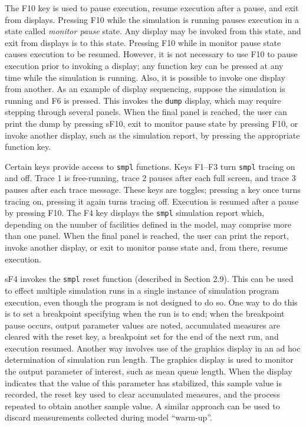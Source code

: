 The F10 key is used to pause execution, resume execution after a pause,
and exit from displays. Pressing F10 while the simulation is running pauses
execution in a state called \emph{monitor pause} state. Any display may be invoked
from this state, and exit from displays is to this state. Pressing F10 while in
monitor pause state causes execution to be resumed. However, it is not
necessary to use F10 to pause execution prior to invoking a display; any
function key can be pressed at any time while the simulation is running.
Also, it is possible to invoke one display from another. As an example of
display sequencing, suppose the simulation is running and F6 is pressed. This
invokes the \texttt{dump} display, which may require stepping through several
panels. When the final panel is reached, the user can print the dump by
pressing sF10, exit to monitor pause state by pressing F10, or invoke another
display, such as the simulation report, by pressing the appropriate function
key.

Certain keys provide access to \texttt{smpl} functions. Keys F1--F3 turn \texttt{smpl}
tracing on and off. Trace 1 is free-running, trace 2 pauses after each full
screen, and trace 3 pauses after each trace message. These keys are toggles;
pressing a key once turns tracing on, pressing it again turns tracing off.
Execution is resumed after a pause by pressing F10. The F4 key displays the
\texttt{smpl} simulation report which, depending on the number of facilities defined
in the model, may comprise more than one panel. When the final panel is
reached, the user can print the report, invoke another display, or exit to
monitor pause state and, from there, resume execution.

sF4 invokes the \texttt{smpl} reset function (described in Section 2.9). This can be
used to effect multiple simulation runs in a single instance of simulation
program execution, even though the program is not designed to do so. One
way to do this is to set a breakpoint specifying when the run is to end; when
the breakpoint pause occurs, output parameter values are noted, accumulated
measures are cleared with the reset key, a breakpoint set for the end of the
next run, and execution resumed. Another way involves use of the graphics
display in an ad hoc determination of simulation run length. The graphics
display is used to monitor the output parameter of interest, such as mean
queue length. When the display indicates that the value of this parameter
has stabilized, this sample value is recorded, the reset key used to clear
accumulated measures, and the process repeated to obtain another sample
value. A similar approach can be used to discard measurements collected
during model ``warm-up''.

